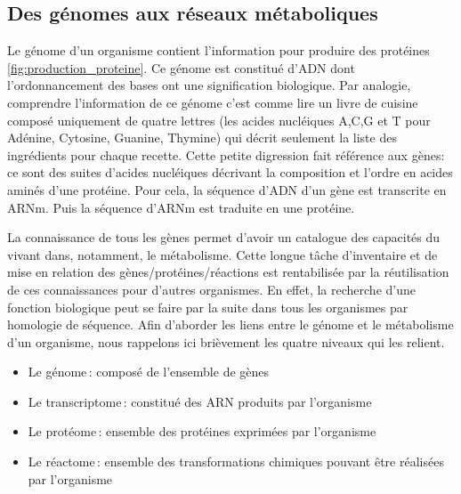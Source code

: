 \begin{refsegment}
    
    \section{Des génomes aux réseaux métaboliques}
    
    Le génome d'un organisme contient l'information pour produire des protéines \ref{fig:production_proteine}. Ce génome est constitué d'\gls{ADN} dont l'ordonnancement des bases ont une signification biologique. Par analogie, comprendre l'information de ce génome c'est comme lire un livre de cuisine composé uniquement de quatre lettres (les acides nucléiques A,C,G et T pour Adénine, Cytosine, Guanine, Thymine) qui décrit seulement la liste des ingrédients pour chaque recette. Cette petite digression fait référence aux gènes: ce sont des suites d'acides nucléiques décrivant la composition et l'ordre en acides aminés d'une protéine. Pour cela, la séquence d'\gls{ADN} d'un gène est transcrite en \gls{ARNm}. Puis la séquence d'{ARNm} est traduite en une protéine.
     
    La connaissance de tous les gènes permet d'avoir un catalogue des capacités du vivant dans, notamment, le métabolisme. Cette longue tâche d'inventaire et de mise en relation des gènes/protéines/réactions est rentabilisée par la réutilisation de ces connaissances pour d'autres organismes. En effet, la recherche d'une fonction biologique peut se faire par la suite dans tous les organismes par homologie de séquence. Afin d'aborder les liens entre le génome et le métabolisme d'un organisme, nous rappelons ici brièvement les quatre niveaux qui les relient. 
        
    \begin{itemize}
        \item Le génome : composé de l'ensemble de gènes
        \item Le transcriptome : constitué des \gls{ARN} produits par l'organisme
        \item Le protéome : ensemble des protéines exprimées par l'organisme
        \item Le réactome : ensemble des transformations chimiques pouvant être réalisées par l'organisme
    \end{itemize}

    

\end{refsegment}
